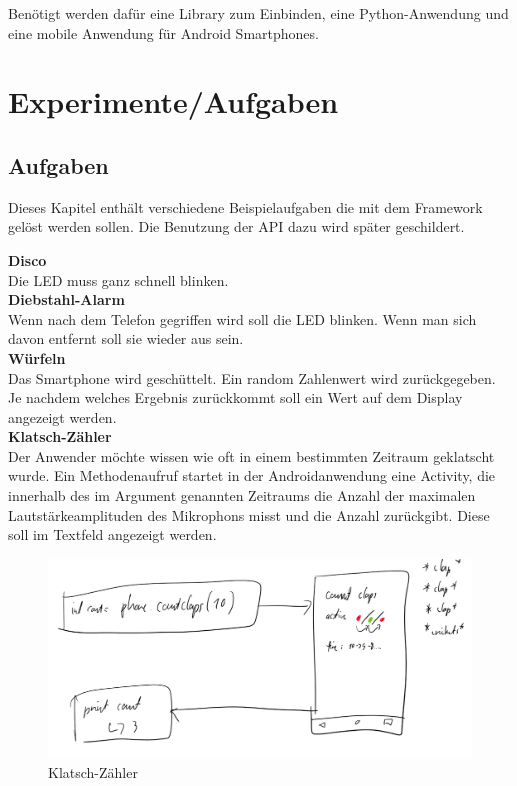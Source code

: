 \documentclass[11pt,a4paper]{report}
\begin{document}
Benötigt werden dafür eine Library zum Einbinden, eine Python-Anwendung und eine mobile Anwendung für Android Smartphones.



\chapter{Experimente/Aufgaben} \label{chap:Experimente}

\section*{Aufgaben}
Dieses Kapitel enthält verschiedene Beispielaufgaben die mit dem Framework gelöst werden sollen.
Die Benutzung der API dazu wird später geschildert.


\textbf{Disco}\\
Die LED muss ganz schnell blinken.
\\

\textbf{Diebstahl-Alarm}\\
Wenn nach dem Telefon gegriffen wird soll die LED blinken.
Wenn man sich davon entfernt soll sie wieder aus sein.
\\

\textbf{Würfeln}\\
Das Smartphone wird geschüttelt.
Ein random Zahlenwert wird zurückgegeben.
Je nachdem welches Ergebnis zurückkommt soll ein Wert auf dem Display angezeigt werden.
\\

\textbf{Klatsch-Zähler}\\
Der Anwender möchte wissen wie oft in einem bestimmten Zeitraum geklatscht wurde.
Ein Methodenaufruf startet in der Androidanwendung eine Activity, die innerhalb des im Argument genannten Zeitraums die Anzahl der maximalen Lautstärkeamplituden des Mikrophons misst und die Anzahl zurückgibt.
Diese soll im Textfeld angezeigt werden.
\begin{figure}[htbp]
  \centering
  \includegraphics[width=.9\textwidth]{images/count_claps.png}
  \caption{Klatsch-Zähler}
  \label{fig:clap_count}
\end{figure}
\\
\end{document}
